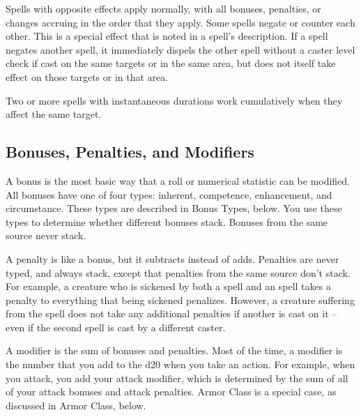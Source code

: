  Spells with opposite effects apply normally, with all bonuses, penalties, or changes accruing in the order that they apply. Some spells negate or counter each other. This is a special effect that is noted in a spell's description. If a spell negates another spell, it immediately dispels the other spell without a caster level check if cast on the same targets or in the same area, but does not itself take effect on those targets or in that area.

 Two or more spells with instantaneous durations work cumulatively when they affect the same target.

\subsection{Bonuses, Penalties, and Modifiers}
A bonus is the most basic way that a roll or numerical statistic can be modified. All bonuses have one of four types: inherent, competence, enhancement, and circumstance. These types are described in Bonus Types, below. You use these types to determine whether different bonuses stack. Bonuses from the same source never stack.

A penalty is like a bonus, but it subtracts instead of adds. Penalties are never typed, and always stack, except that penalties from the same source don't stack. For example, a creature who is sickened by both a  spell and an  spell takes a  penalty to everything that being sickened penalizes. However, a creature suffering from the  spell does not take any additional penalties if another  is cast on it -- even if the second spell is cast by a different caster.

A modifier is the sum of bonuses and penalties. Most of the time, a modifier is the number that you add to the d20 when you take an action. For example, when you attack, you add your attack modifier, which is determined by the sum of all of your attack bonuses and attack penalties. Armor Class is a special case, as discussed in Armor Class, below.

